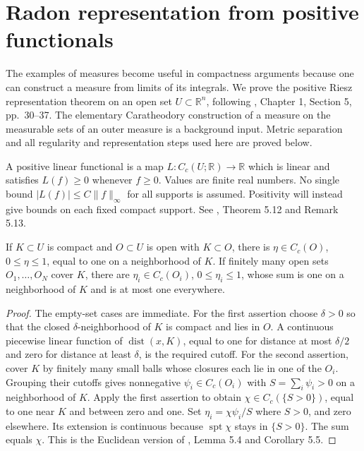 \chapter{Radon representation from positive functionals}\label{sec:radon-representation}
The examples of measures become useful in compactness arguments because one can construct a measure from limits of its integrals. We prove the positive Riesz representation theorem on an open set $U\subset\mathbb R^n$, following \cite{Sim18}, Chapter 1, Section 5, pp.~30--37. The elementary Caratheodory construction of a measure on the measurable sets of an outer measure is a background input. Metric separation and all regularity and representation steps used here are proved below.

\begin{definition}\label{def:positive-test-functional}
A positive linear functional is a map $L:C_c(U;\mathbb R)\to\mathbb R$ which is linear and satisfies $L(f)\geq0$ whenever $f\geq0$. Values are finite real numbers. No single bound $|L(f)|\leq C\|f\|_\infty$ for all supports is assumed. Positivity will instead give bounds on each fixed compact support. See \cite{Sim18}, Theorem 5.12 and Remark 5.13.
\end{definition}

\begin{lemma}\label{lem:radon-compact-cutoffs}
If $K\subset U$ is compact and $O\subset U$ is open with $K\subset O$, there is $\eta\in C_c(O)$, $0\leq\eta\leq1$, equal to one on a neighborhood of $K$. If finitely many open sets $O_1,\ldots,O_N$ cover $K$, there are $\eta_i\in C_c(O_i)$, $0\leq\eta_i\leq1$, whose sum is one on a neighborhood of $K$ and is at most one everywhere.
\end{lemma}
\begin{proof}
The empty-set cases are immediate. For the first assertion choose $\delta>0$ so that the closed $\delta$-neighborhood of $K$ is compact and lies in $O$. A continuous piecewise linear function of $\operatorname{dist}(x,K)$, equal to one for distance at most $\delta/2$ and zero for distance at least $\delta$, is the required cutoff. For the second assertion, cover $K$ by finitely many small balls whose closures each lie in one of the $O_i$. Grouping their cutoffs gives nonnegative $\psi_i\in C_c(O_i)$ with $S=\sum_i\psi_i>0$ on a neighborhood of $K$. Apply the first assertion to obtain $\chi\in C_c(\{S>0\})$, equal to one near $K$ and between zero and one. Set $\eta_i=\chi\psi_i/S$ where $S>0$, and zero elsewhere. Its extension is continuous because $\operatorname{spt}\chi$ stays in $\{S>0\}$. The sum equals $\chi$. This is the Euclidean version of \cite{Sim18}, Lemma 5.4 and Corollary 5.5.
\end{proof}

